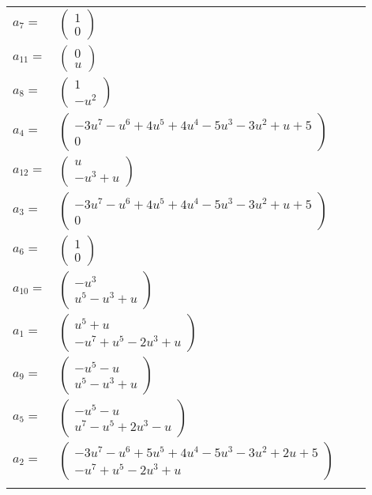 \documentclass[1p]{elsarticle_modified}
\theoremstyle{definition}
\begin{document}
\begin{tabular}{m{7pt} m{180pt} m{7pt} m{180pt} }
\flushright $a_{7}=$&$\begin{pmatrix}1\\0\end{pmatrix}$ \\
\flushright $a_{11}=$&$\begin{pmatrix}0\\u\end{pmatrix}$ \\
\flushright $a_{8}=$&$\begin{pmatrix}1\\- u^2\end{pmatrix}$ \\
\flushright $a_{4}=$&$\begin{pmatrix}-3 u^7- u^6+4 u^5+4 u^4-5 u^3-3 u^2+u+5\\0\end{pmatrix}$ \\
\flushright $a_{12}=$&$\begin{pmatrix}u\\- u^3+u\end{pmatrix}$ \\
\flushright $a_{3}=$&$\begin{pmatrix}-3 u^7- u^6+4 u^5+4 u^4-5 u^3-3 u^2+u+5\\0\end{pmatrix}$ \\
\flushright $a_{6}=$&$\begin{pmatrix}1\\0\end{pmatrix}$ \\
\flushright $a_{10}=$&$\begin{pmatrix}- u^3\\u^5- u^3+u\end{pmatrix}$ \\
\flushright $a_{1}=$&$\begin{pmatrix}u^5+u\\- u^7+u^5-2 u^3+u\end{pmatrix}$ \\
\flushright $a_{9}=$&$\begin{pmatrix}- u^5- u\\u^5- u^3+u\end{pmatrix}$ \\
\flushright $a_{5}=$&$\begin{pmatrix}- u^5- u\\u^7- u^5+2 u^3- u\end{pmatrix}$ \\
\flushright $a_{2}=$&$\begin{pmatrix}-3 u^7- u^6+5 u^5+4 u^4-5 u^3-3 u^2+2 u+5\\- u^7+u^5-2 u^3+u\end{pmatrix}$\\&\end{tabular}
\end{document}
